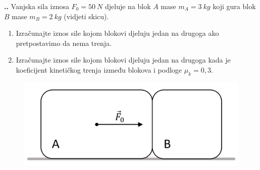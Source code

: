

\noindent 
\textbf{
\thecjelina.\thezadatak.}
Vanjska sila iznosa $F_0=50\ N$ djeluje na blok $A$ mase $m_A=3\ kg$  koji gura blok 
$B$ mase $m_B=2\ kg$ (vidjeti skicu). 
\begin{enumerate}[label=\alph*)]
 \item Izračunajte iznos sile kojom blokovi djeluju jedan na drugoga ako pretpostavimo da nema trenja.
 \item Izračunajte iznos sile kojom blokovi djeluju jedan na drugoga kada je koeficijent kinetičkog trenja između blokova i podloge $\mu_k =0,3$.
\end{enumerate}


\begin{figure}[h]%
  \begin{center}
    \includegraphics[scale=0.250]{03_Dinamika_materijalne_tocke/zadatak_D310.png}
  \end{center}
\end{figure}

